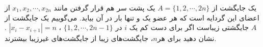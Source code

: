 \EXERCISE
یک جایگشت از
$A = \{1, 2, \cdots, 2n\}$
یک پشت سر هم قرار گرفتن مانند
$x_1, x_2, \cdots, x_{2n}$
از اعضای این گردایه است که هر عضو یک و تنها بار در آن بیاید. می‌گوییم یک جایگشت از
$A$
جایگشتی زیباست اگر برای دست کم یک
$i$
در
$\{1,  2, \cdots, 2n-1\}$
،
$|x_i - x_{i+1}| = n$
. نشان دهید برای هر$n$، جایگشت‌های زیبا از جایگشت‌های غیرزیبا بیشترند.
